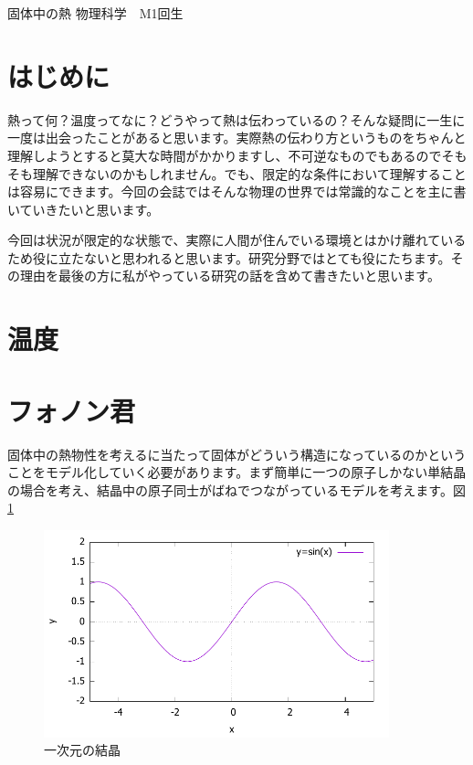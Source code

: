 \documentclass[10pt,b5paper,papersize,dvipdfmx]{jsbook}
\begin{document}


\kaishititle%
  {固体中の熱}%
  {物理科学　M1回生}%
  {}%

\section*{はじめに}
熱って何？温度ってなに？どうやって熱は伝わっているの？そんな疑問に一生に一度は出会ったことがあると思います。実際熱の伝わり方というものをちゃんと理解しようとすると莫大な時間がかかりますし、不可逆なものでもあるのでそもそも理解できないのかもしれません。でも、限定的な条件において理解することは容易にできます。今回の会誌ではそんな物理の世界では常識的なことを主に書いていきたいと思います。\par
今回は状況が限定的な状態で、実際に人間が住んでいる環境とはかけ離れているため役に立たないと思われると思います。研究分野ではとても役にたちます。その理由を最後の方に私がやっている研究の話を含めて書きたいと思います。


%
\section{温度}



\section{フォノン君}
固体中の熱物性を考えるに当たって固体がどういう構造になっているのかということをモデル化していく必要があります。まず簡単に一つの原子しかない単結晶の場合を考え、結晶中の原子同士がばねでつながっているモデルを考えます。図\ref{fig:bane}
\begin{figure}[htbp]
  \centering
  \includegraphics[width=10cm]{temp/fig-sin.pdf}
  \caption{一次元の結晶}
  \label{fig:bane}
\end{figure}
\end{document}
